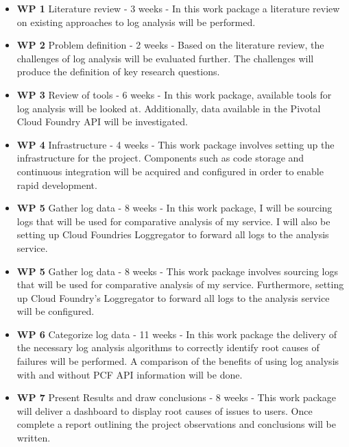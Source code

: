 \begin{itemize}
  \item \textbf{WP 1} Literature review - 3 weeks - In this work package a literature review on existing approaches to log analysis will be performed.
  
  \item \textbf{WP 2} Problem definition - 2 weeks - Based on the literature review, the challenges of log analysis will be evaluated further. The challenges will produce the definition of key research questions.
  
  \item \textbf{WP 3} Review of tools - 6 weeks - In this work package, available tools for log analysis will be looked at. Additionally, data available in the Pivotal Cloud Foundry API will be investigated.
  
\item \textbf{WP 4} Infrastructure - 4 weeks - This work package involves setting up the infrastructure for the project. Components such as code storage and continuous integration will be acquired and configured in order to enable rapid development. 
  
  \item \textbf{WP 5} Gather log data - 8 weeks - In this work package, I will be sourcing logs that will be used for comparative analysis of my service. I will also be setting up Cloud Foundries Loggregator to forward all logs to the analysis service.
  
  \item \textbf{WP 5} Gather log data - 8 weeks - This work package involves sourcing logs that will be used for comparative analysis of my service. Furthermore, setting up Cloud Foundry's Loggregator to forward all logs to the analysis service will be configured.
  
  \item \textbf{WP 6} Categorize log data - 11 weeks - In this work package the delivery of the necessary log analysis algorithms to correctly identify root causes of failures will be performed. A comparison of the benefits of using log analysis with and without PCF API information will be done.
    
  \item \textbf{WP 7} Present Results and draw conclusions - 8 weeks - This work package will deliver a dashboard to display root causes of issues to users. Once complete a report outlining the project observations and conclusions will be written.
\end{itemize}

